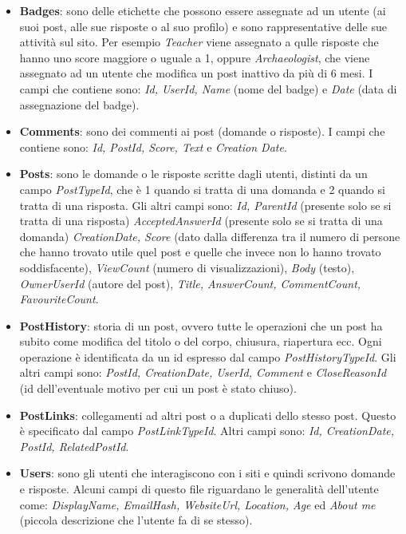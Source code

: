 \begin{itemize}
    \item \textbf{Badges}: sono delle etichette che possono essere assegnate ad un utente (ai suoi post, alle sue risposte o al suo profilo) e sono rappresentative delle sue attività sul sito. Per esempio \textit{Teacher} viene assegnato a qulle risposte che hanno uno score maggiore o uguale a 1, oppure \textit{Archaeologist}, che viene assegnato ad un utente che modifica un post inattivo da più di 6 mesi. I campi che contiene sono: \textit{Id, UserId, Name} (nome del badge) e \textit{Date} (data di assegnazione del badge).
    \item \textbf{Comments}: sono dei commenti ai post (domande o risposte). I campi che contiene sono: \textit{Id, PostId, Score, Text} e \textit{Creation Date}.
    \item \textbf{Posts}: sono le domande o le risposte scritte dagli utenti, distinti da un campo \textit{PostTypeId}, che è 1 quando si tratta di una domanda e 2 quando si tratta di una risposta. Gli altri campi sono: \textit{Id, ParentId} (presente solo se si tratta di una risposta) \textit{AcceptedAnswerId} (presente solo se si tratta di una domanda) \textit{CreationDate, Score} (dato dalla differenza tra il numero di persone che hanno trovato utile quel post e quelle che invece non lo hanno trovato soddisfacente), \textit{ViewCount} (numero di visualizzazioni), \textit{Body} (testo), \textit{OwnerUserId} (autore del post), \textit{Title, AnswerCount, CommentCount, FavouriteCount}.
    \item \textbf{PostHistory}: storia di un post, ovvero tutte le operazioni che un post ha subito come modifica del titolo o del corpo, chiusura, riapertura ecc. Ogni operazione è identificata da un id espresso dal campo \textit{PostHistoryTypeId}. Gli altri campi sono: \textit{PostId, CreationDate, UserId, Comment} e \textit{CloseReasonId} (id dell'eventuale motivo per cui un post è stato chiuso).
    \item \textbf{PostLinks}: collegamenti ad altri post o a duplicati dello stesso post. Questo è specificato dal campo \textit{PostLinkTypeId}. Altri campi sono: \textit{Id, CreationDate, PostId, RelatedPostId}.
    \item \textbf{Users}: sono gli utenti che interagiscono con i siti e quindi scrivono domande e risposte. Alcuni campi di questo file riguardano le generalità dell'utente come: \textit{DisplayName, EmailHash, WebsiteUrl, Location, Age} ed \textit{About me} (piccola descrizione che l'utente fa di se stesso).\\ 

\end{itemize}
